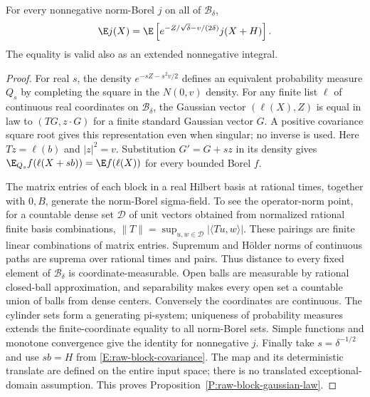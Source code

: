 \begin{proposition}
  \label{P:raw-block-gaussian-law}
  For every nonnegative norm-Borel $j$ on all of $\mathscr B_\delta$,
  \begin{equation}\label{E:raw-block-gaussian-law}
    \E j(X)=
    \E\left[e^{-Z/\sqrt\delta-v/(2\delta)}j(X+H)\right].
  \end{equation}
  The equality is valid also as an extended nonnegative integral.
\end{proposition}

\begin{proof}
  For real $s$, the density $e^{-sZ-s^2v/2}$ defines an equivalent
  probability measure $Q_s$ by completing the square in the
  $N(0,v)$ density. For any finite list $\ell$ of continuous real
  coordinates on $\mathscr B_\delta$, the Gaussian vector
  $(\ell(X),Z)$ is equal in law to $(TG,z\cdot G)$ for a finite
  standard Gaussian vector $G$. A positive covariance square root
  gives this representation even when singular; no inverse is used.
  Here $Tz=\ell(b)$ and $|z|^2=v$. Substitution $G'=G+sz$ in its
  density gives
  $\E_{Q_s}f(\ell(X+sb))=\E f(\ell(X))$ for every bounded Borel $f$.

  The matrix entries of each block in a real Hilbert basis at
  rational times, together with $0,B$, generate the norm-Borel
  sigma-field. To see the operator-norm point, for a countable dense
  set $\mathcal D$ of unit vectors obtained from normalized rational
  finite basis combinations,
  $\|T\|=\sup_{u,w\in\mathcal D}|\langle Tu,w\rangle|$.
  These pairings are finite linear combinations of matrix entries.
  Supremum and H\"older norms of continuous paths are suprema over
  rational times and pairs. Thus distance to every fixed element
  of $\mathscr B_\delta$ is coordinate-measurable. Open balls are
  measurable by rational closed-ball approximation, and separability
  makes every open set a countable union of balls from dense centers.
  Conversely the coordinates are continuous.
  The cylinder sets form a generating pi-system; uniqueness of
  probability measures extends the finite-coordinate equality to
  all norm-Borel sets. Simple functions and monotone convergence
  give the identity for nonnegative $j$. Finally take
  $s=\delta^{-1/2}$ and use $sb=H$ from
  \eqref{E:raw-block-covariance}. The map and its deterministic
  translate are defined on the entire input space; there is no
  translated exceptional-domain assumption.
  This proves Proposition~\ref{P:raw-block-gaussian-law}.
\end{proof}

